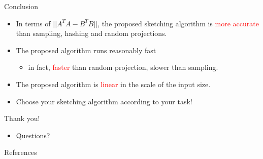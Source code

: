 \documentclass[first=dgreen,second=purple,logo=redque]{aaltoslides}
\begin{document}
\begin{frame}{Conclusion}
\begin{itemize}
  \item In terms of $|| A^TA - B^TB||$, the proposed sketching algorithm is \textcolor{red}{more accurate} than sampling, hashing and random projections.
  \item The proposed algorithm runs reasonably fast
  \begin{itemize}\item in fact, \textcolor{red}{faster} than random projection, slower than sampling.\end{itemize}
  \item The proposed algorithm is \textcolor{red}{linear} in the scale of the input size.
  \item Choose your sketching algorithm according to your task!
\end{itemize}
\end{frame}


\begin{frame}{Thank you!}
\begin{itemize}
  \item \LARGE{Questions?}
\end{itemize}
\end{frame}


\begin{frame}[allowframebreaks=1]{References}
\small

\end{frame}
\end{document}
